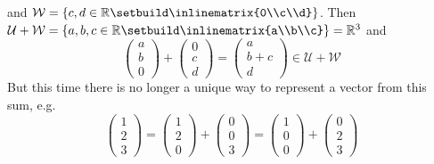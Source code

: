 \begin{exm}
\begin{enumerate}
		      and
		      $\mathcal{W}=\left\{c,d\in\mathbb{R}\setbuild\inlinematrix{0\\c\\d}\right\}$.
		      Then
		      $\mathcal{U}+\mathcal{W}=\left\{a,b,c\in\mathbb{R}\setbuild\inlinematrix{a\\b\\c}\right\}=\mathbb{R}^3$
		      and
		      \begin{equation*}
			      \begin{pmatrix}
				      a \\b\\0
			      \end{pmatrix}+
			      \begin{pmatrix}
				      0 \\c\\d
			      \end{pmatrix}=
			      \begin{pmatrix}
				      a \\b+c\\d
			      \end{pmatrix}\in\mathcal{U}+\mathcal{W}
		      \end{equation*}
		      But this time there is no longer a unique way to represent a vector from
		      this sum, e.g.
		      \begin{equation*}
			      \begin{pmatrix}
				      1 \\2\\3
			      \end{pmatrix}=
			      \begin{pmatrix}
				      1 \\2\\0
			      \end{pmatrix}+
			      \begin{pmatrix}
				      0 \\0\\3
			      \end{pmatrix}=
			      \begin{pmatrix}
				      1 \\0\\0
			      \end{pmatrix}+
			      \begin{pmatrix}
				      0 \\2\\3
			      \end{pmatrix}
		      \end{equation*}

\end{enumerate}
\end{exm}
